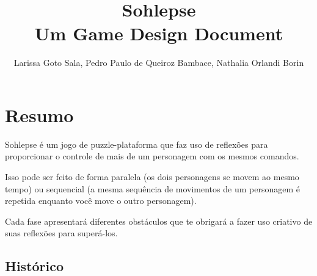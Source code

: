 \documentclass[a4paper, 11pt]{article}
\title{\textbf{Sohlepse} \\ \small{Um Game Design Document}}
\author{Larissa Goto Sala, Pedro Paulo de Queiroz Bambace, Nathalia Orlandi Borin}
\begin{document}
 
 
\maketitle 
 
\newpage 
 
\newpage 
 
\section{Resumo} 
	 
	Sohlepse é um jogo de puzzle-plataforma que faz uso de reflexões para proporcionar o controle de mais de um personagem com os mesmos comandos. 
 
Isso pode ser feito de forma paralela (os dois personagens se movem ao mesmo tempo) ou sequencial (a mesma sequência de movimentos de um personagem é repetida enquanto você move o outro personagem). 
 
Cada fase apresentará diferentes obstáculos que te obrigará a fazer uso criativo de suas reflexões para superá-los. 
 
\subsection{Histórico}
\end{document}
